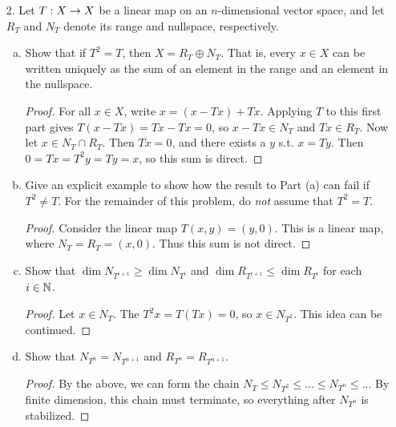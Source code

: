 \begin{itemize}
\begin{enumerate}[(a)]
\begin{proof}
Suppose $Ax = \lambda x$. Then $A(Bx) = B(Ax) = \lambda (Bx)$ implies that both $x$ and $Bx$ are eigenvectors of A. But wait a minute - since A has $n$ distinct eigenvalues, its eigenspaces are 1-dim. Thus $Bx$ is a multiple of $x$, so $x$ is an eigenvalue of both $A$ and $B$.
\end{proof}
\end{enumerate}











\item[2.] Let $T : X \rightarrow X$ be a linear map on an $n$-dimensional vector space, and let $R_T$ and
$N_T$ denote its range and nullspace, respectively.
\begin{enumerate}[(a)]
\item Show that if $T^2 = T$, then $X = R_T \oplus N_T$. That is, every $x \in X$ can
be written uniquely as the sum of an element in the range and an element in
the nullspace.
\begin{proof}
    For all $x \in X$, write $x = (x-Tx) + Tx$. Applying $T$ to this first part gives $T(x-Tx) = Tx - Tx = 0$, so $x-Tx \in N_T$ and $Tx \in R_T$. Now let $x \in N_T \cap R_T$. Then $Tx = 0$, and there exists a $y$ s.t. $x = Ty$. Then $0 = Tx = T^2 y = Ty = x$, so this sum is direct.
\end{proof}


\item Give an explicit example to show how the result to Part (a) can fail if
$T^2 \neq T$. For the remainder of this problem, do \textit{not} assume that $T^2 = T $.
\begin{proof}
    Consider the linear map $T(x,y) = (y,0)$. This is a linear map, where $N_T = R_T = (x,0)$. Thus this sum is not direct. 
\end{proof}


\item Show that $\dim N_{T^{i+1}} \geq \dim N_{T^i}$ and $\dim R_{T^{i+1}} \leq \dim R_{T^i}$ for each
$i \in \mathbb{N}$.
\begin{proof}
    Let $x \in N_T$. The $T^2x = T(Tx) = 0$, so $x \in N_{T^2}$. This idea can be continued.
\end{proof}

\item Show that $N_{T^{n}} = N_{T^{n+1}}$ and $R_{T^{n}} = R_{T^{n+1}}$.
\begin{proof}
    By the above, we can form the chain $N_T \leq N_{T^2} \leq ... \leq N_{T^n} \leq ...$ By finite dimension, this chain must terminate, so everything after $N_{T^n}$ is stabilized.
\end{proof}



\end{enumerate}
\end{itemize}
